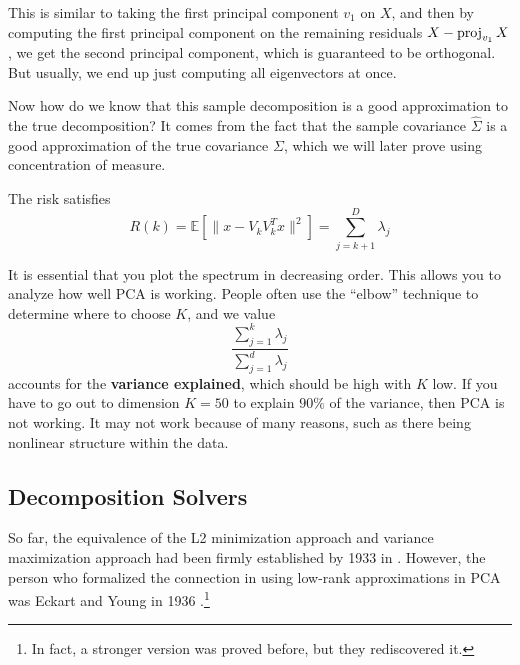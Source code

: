   This is similar to taking the first principal component $v_1$ on $X$, and then by computing the first principal component on the remaining residuals $X - \proj_{v_1} X$, we get the second principal component, which is guaranteed to be orthogonal. But usually, we end up just computing all eigenvectors at once. 

  Now how do we know that this sample decomposition is a good approximation to the true decomposition? It comes from the fact that the sample covariance $\hat{\Sigma}$ is a good approximation of the true covariance $\Sigma$, which we will later prove using concentration of measure. 

  \begin{theorem}[Risk]
    The risk satisfies 
    \begin{equation}
      R(k) = \mathbb{E}[\| x - V_k V_k^T x \|^2 ] = \sum_{j=k+1}^D \lambda_j 
    \end{equation}
  \end{theorem}

  It is essential that you plot the spectrum in decreasing order. This allows you to analyze how well PCA is working. People often use the ``elbow'' technique to determine where to choose $K$, and we value 
  \begin{equation}
    \frac{\sum_{j=1}^k \lambda_j}{\sum_{j=1}^d \lambda_j} 
  \end{equation}
  accounts for the \textbf{variance explained}, which should be high with $K$ low. If you have to go out to dimension $K=50$ to explain $90\%$ of the variance, then PCA is not working. It may not work because of many reasons, such as there being nonlinear structure within the data. 

\subsection{Decomposition Solvers}

  So far, the equivalence of the L2 minimization approach and variance maximization approach had been firmly established by 1933 in \cite{1933hotelling}. However, the person who formalized the connection in using low-rank approximations in PCA was Eckart and Young in 1936 \cite{1936eckart}.\footnote{In fact, a stronger version was proved before, but they rediscovered it.}
  
